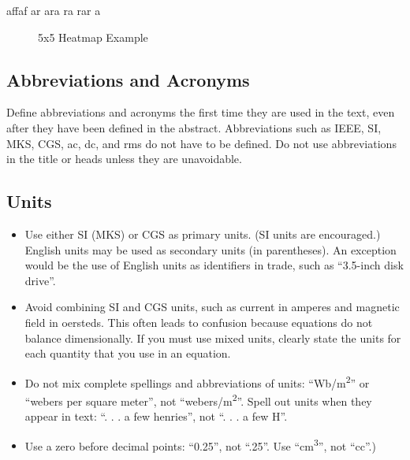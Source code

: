 \documentclass[conference]{IEEEtran}
\begin{document}
affaf
ar
ara
ra
rar
a
\begin{figure}[h]
\centering
{}
\caption{5x5 Heatmap Example}
\label{fig:heatmap}
\end{figure}
















\subsection{Abbreviations and Acronyms}\label{AA}
Define abbreviations and acronyms the first time they are used in the text, 
even after they have been defined in the abstract. Abbreviations such as 
IEEE, SI, MKS, CGS, ac, dc, and rms do not have to be defined. Do not use 
abbreviations in the title or heads unless they are unavoidable.

\subsection{Units}
\begin{itemize}
\item Use either SI (MKS) or CGS as primary units. (SI units are encouraged.) English units may be used as secondary units (in parentheses). An exception would be the use of English units as identifiers in trade, such as ``3.5-inch disk drive''.
\item Avoid combining SI and CGS units, such as current in amperes and magnetic field in oersteds. This often leads to confusion because equations do not balance dimensionally. If you must use mixed units, clearly state the units for each quantity that you use in an equation.
\item Do not mix complete spellings and abbreviations of units: ``Wb/m\textsuperscript{2}'' or ``webers per square meter'', not ``webers/m\textsuperscript{2}''. Spell out units when they appear in text: ``. . . a few henries'', not ``. . . a few H''.
\item Use a zero before decimal points: ``0.25'', not ``.25''. Use ``cm\textsuperscript{3}'', not ``cc''.)
\end{itemize}
\end{document}
